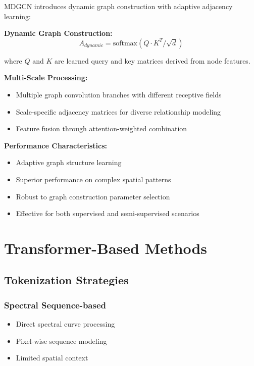 \documentclass[journal]{IEEEtran}
\begin{document}
MDGCN \cite{wan2021multiscale} introduces dynamic graph construction with adaptive adjacency learning:

\textbf{Dynamic Graph Construction:}
\begin{equation}
A_{dynamic} = \text{softmax}(Q \cdot K^T / \sqrt{d})
\end{equation}

where $Q$ and $K$ are learned query and key matrices derived from node features.

\textbf{Multi-Scale Processing:}
\begin{itemize}
\item Multiple graph convolution branches with different receptive fields
\item Scale-specific adjacency matrices for diverse relationship modeling
\item Feature fusion through attention-weighted combination
\end{itemize}

\textbf{Performance Characteristics:}
\begin{itemize}
\item Adaptive graph structure learning
\item Superior performance on complex spatial patterns
\item Robust to graph construction parameter selection
\item Effective for both supervised and semi-supervised scenarios
\end{itemize}

\section{Transformer-Based Methods}

\subsection{Tokenization Strategies}

\subsubsection{Spectral Sequence-based}
\begin{itemize}
\item Direct spectral curve processing
\item Pixel-wise sequence modeling
\item Limited spatial context
\end{itemize}
\end{document}
